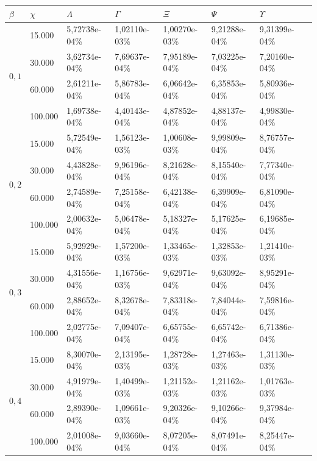 \begin{table}[!ht]
\begin{center}
\begin{tabular}{|l|l|l|l|l|l|l|l|} %
\hline
$\beta$ & $\chi$ & $\Lambda$ & $\Gamma$ & $\Xi$ & $\Psi$ & $\Upsilon$ \\
\hline %
\multirow{4}{*}{$0,1$}
& 15.000 & 5,72738e-04\% & 1,02110e-03\% & 1,00270e-03\% & 9,21288e-04\% & 9,31399e-04\% \\
& 30.000 & 3,62734e-04\% & 7,69637e-04\% & 7,95189e-04\% & 7,03225e-04\% & 7,20160e-04\% \\
& 60.000 & 2,61211e-04\% & 5,86783e-04\% & 6,06642e-04\% & 6,35853e-04\% & 5,80936e-04\% \\
& 100.000 & 1,69738e-04\% & 4,40143e-04\% & 4,87852e-04\% & 4,88137e-04\% & 4,99830e-04\% \\
\hline %
\multirow{4}{*}{$0,2$}
& 15.000 & 5,72549e-04\% & 1,56123e-03\% & 1,00608e-03\% & 9,99809e-04\% & 8,76757e-04\% \\
& 30.000 & 4,43828e-04\% & 9,96196e-04\% & 8,21628e-04\% & 8,15540e-04\% & 7,77340e-04\% \\
& 60.000 & 2,74589e-04\% & 7,25158e-04\% & 6,42138e-04\% & 6,39909e-04\% & 6,81090e-04\% \\
& 100.000 & 2,00632e-04\% & 5,06478e-04\% & 5,18327e-04\% & 5,17625e-04\% & 6,19685e-04\% \\
\hline %
\multirow{4}{*}{$0,3$}
& 15.000 & 5,92929e-04\% & 1,57200e-03\% & 1,33465e-03\% & 1,32853e-03\% & 1,21410e-03\% \\
& 30.000 & 4,31556e-04\% & 1,16756e-03\% & 9,62971e-04\% & 9,63092e-04\% & 8,95291e-04\% \\
& 60.000 & 2,88652e-04\% & 8,32678e-04\% & 7,83318e-04\% & 7,84044e-04\% & 7,59816e-04\% \\
& 100.000 & 2,02775e-04\% & 7,09407e-04\% & 6,65755e-04\% & 6,65742e-04\% & 6,71386e-04\% \\
\hline %
\multirow{4}{*}{$0,4$}
& 15.000 & 8,30070e-04\% & 2,13195e-03\% & 1,28728e-03\% & 1,27463e-03\% & 1,31130e-03\% \\
& 30.000 & 4,91979e-04\% & 1,40499e-03\% & 1,21152e-03\% & 1,21162e-03\% & 1,01763e-03\% \\
& 60.000 & 2,89390e-04\% & 1,09661e-03\% & 9,20326e-04\% & 9,10266e-04\% & 9,37984e-04\% \\
& 100.000 & 2,01008e-04\% & 9,03660e-04\% & 8,07205e-04\% & 8,07491e-04\% & 8,25447e-04\% \\

\end{tabular}
\end{center}
\end{table}
